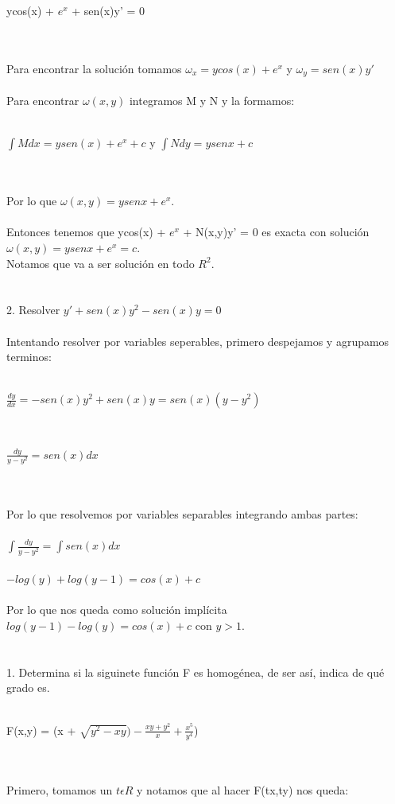 \documentclass[a4paper,10pt]{article}
\begin{document}
\centerline{ycos(x) + $e^x$ + sen(x)y' = 0}\\\\
Para encontrar la solución tomamos $\omega_x = ycos(x) + e^x$ y $\omega_y=sen(x)y'$ \\\\
Para encontrar $\omega (x,y)$ integramos M y N y la formamos:\\\\
\centerline{$\int Mdx = ysen(x)+e^x + c$ y $\int N dy = ysenx + c$}\\\\
Por lo que $\omega (x,y) = ysenx + e^x$.\\\\
Entonces tenemos que ycos(x) + $e^x$ + N(x,y)y' = 0  es exacta con solución $\omega (x,y) = ysenx + e^x = c$.\\
Notamos que va a ser solución en todo $R^2$.\\\\\\
2. Resolver $y' + sen(x)y^2 -sen(x)y = 0$\\\\
Intentando resolver por variables seperables, primero despejamos y agrupamos terminos:\\\\
\centerline{$\frac{dy}{dx} = -sen(x)y^2 + sen(x)y = sen(x)(y-y^2)$}\\
\centerline{$\frac{dy}{y-y^2}= sen(x) dx$}\\\\
Por lo que resolvemos por variables separables integrando ambas partes:\\\\
$\int \frac{dy}{y-y^2}= \int sen(x) dx$\\\\
$-log(y) + log(y-1) = cos(x) + c $\\\\
Por lo que nos queda como solución implícita $log(y-1)-log(y)   = cos(x) + c $ con $y>1$.\\\\\\
1. Determina si la siguinete función F es homogénea, de ser así,
indica de qué grado es.\\\\
\centerline{ F(x,y) = (x + $\sqrt{y^2 - xy}) - \frac{xy + y^2 }{x} + \frac{x^5}{y^4}$)}\\\\
Primero, tomamos un $t\epsilon R$ y notamos que al hacer F(tx,ty) nos queda:\\\\
\end{document}
